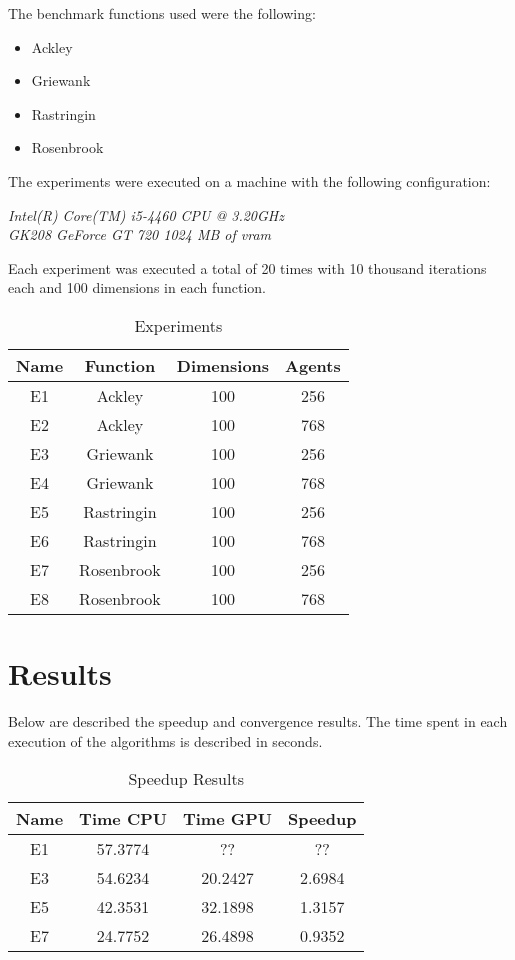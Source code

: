 \documentclass[conference]{IEEEtran}
\begin{document}
The benchmark functions used were the following:

\begin{itemize}
    \item Ackley
    \item Griewank
    \item Rastringin
    \item Rosenbrook
\end{itemize}

The experiments were executed on a machine with the following configuration:

\textit{Intel(R) Core(TM) i5-4460  CPU @ 3.20GHz \\ GK208 GeForce GT 720 1024 MB of vram}

Each experiment was executed a total of 20 times with 10 thousand iterations each and 100 dimensions in each function.

\begin{table}[!htbp]
    \renewcommand{\arraystretch}{1.3}
    \caption{Experiments}
    \label{experiments}
    \centering
    \begin{tabular}{c|c|c|c}
    \hline
        \bf Name & Function &  Dimensions & Agents\\
    \hline
        E1 & Ackley & 100 & 256\\
        E2 & Ackley & 100 & 768\\
        E3 & Griewank & 100 & 256\\
        E4 & Griewank & 100 & 768\\
        E5 & Rastringin & 100 & 256\\
        E6 & Rastringin & 100 & 768\\
        E7 & Rosenbrook & 100 & 256\\
        E8 & Rosenbrook & 100 & 768\\
    \end{tabular}
\end{table}

\section{Results}

Below are described the speedup and convergence results. The time spent in each execution of the algorithms is described in seconds.

\begin{table}[!t]
    \renewcommand{\arraystretch}{1.3}
    \caption{Speedup Results}
    \label{results}
    \centering
    \begin{tabular}{c|c|c|c}
    \hline
        \bf Name & Time CPU & Time GPU & Speedup\\
    \hline
        E1 & 57.3774 & ?? & ?? \\
        E3 & 54.6234 & 20.2427 & 2.6984 \\
        E5 & 42.3531 & 32.1898 & 1.3157 \\
        E7 & 24.7752 & 26.4898 & 0.9352 \\
    \end{tabular}
\end{table}
\end{document}
